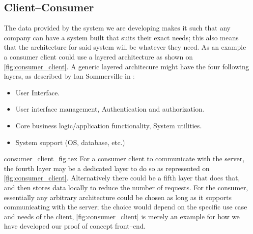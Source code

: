 \subsection{Client--Consumer}
The data provided by the system we are developing makes it such that any company can have a system built that suits their exact needs; this also means that the architecture for said system will be whatever they need.
As an example a consumer client could use a layered architecture as shown on \cref{fig:consumer_client}.
A generic layered architecure might have the four following layers, as described by Ian Sommerville in \cite{software_engineering}:
\begin{itemize}
    \item User Interface.
    \item User interface management, Authentication and authorization.
    \item Core business logic/application functionality, System utilities.
    \item System support (OS, database, etc.)
\end{itemize}
{consumer_client_fig.tex}
For a consumer client to communicate with the server, the fourth layer may be a dedicated layer to do so as represented on \cref{fig:consumer_client}.
Alternatively there could be a fifth layer that does that, and then stores data locally to reduce the number of requests.
For the consumer, essentially any arbitrary architecture could be chosen as long as it supports communicating with the server; the choice would depend on the specific use case and needs of the client, \cref{fig:consumer_client} is merely an example for how we have developed our proof of concept front--end.
